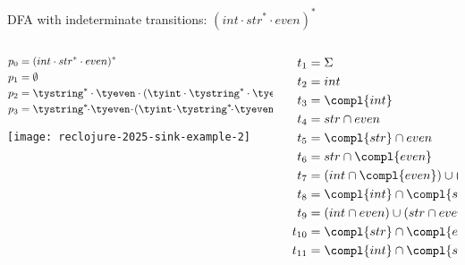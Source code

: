 {\begin{frame}{DFA with indeterminate transitions: $(int \cdot str^{*} \cdot even)^{*}$}
  \begin{columns}
    \begin{column}{0.5\textwidth}
      \begin{align*}
        p_0 &= (int \cdot str^{*} \cdot even)^{*}\\
        p_1 &= \emptyset\\
        p_2 &= \tystring^{*} \cdot \tyeven \cdot (\tyint \cdot \tystring^{*} \cdot \tyeven)^{*}\\
        p_3 &= \tystring^{*}\!\!\cdot\! \tyeven\!\cdot\! (\tyint\! \cdot\! \tystring^{*}\!\!\cdot\! \tyeven)^{*}\! \reor (\tyint\! \cdot\! \tystring^{*}\!\!\cdot\!\! \tyeven)^{*}
      \end{align*}



      \texttt{[image: reclojure-2025-sink-example-2]}
    \end{column}
    \begin{column}{0.5\textwidth}
      \begin{align*}
        t_1 &= \Sigma\\
        t_2 &= int  \\
        t_3 &= \compl{int}\\
        t_4 &= str \cap even\\
        t_5 &= \compl{str} \cap even\\
        t_6 &= str \cap \compl{even}\\
        t_7 &= (int \cap \compl{even}) \cup (str \cap \compl{even})\\
        t_8   &=\compl{int} \cap \compl{str} \cap even\\
        t_9 &=(int \cap even) \cup (str \cap even)\\
        t_{10} &=\compl{str} \cap \compl{even}\\
        t_{11} &=\compl{int} \cap \compl{str} \cap \compl{even}
      \end{align*}
    \end{column}
  \end{columns}
\end{frame}


      
}
